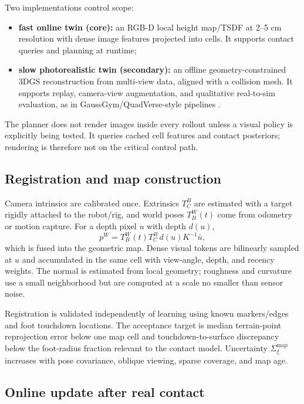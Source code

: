 Two implementations control scope:
\begin{itemize}
  \item \textbf{fast online twin (core):} an RGB-D local height map/TSDF at 2--5 cm resolution with dense image features projected into cells. It supports contact queries and planning at runtime;
  \item \textbf{slow photorealistic twin (secondary):} an offline geometry-constrained 3DGS reconstruction from multi-view data, aligned with a collision mesh. It supports replay, camera-view augmentation, and qualitative real-to-sim evaluation, as in GaussGym/QuadVerse-style pipelines \citep{escontrela2025gaussgym,chen2026quadverse}.
\end{itemize}
The planner does not render images inside every rollout unless a visual policy is explicitly being tested. It queries cached cell features and contact posteriors; rendering is therefore not on the critical control path.

\subsection{Registration and map construction}

Camera intrinsics are calibrated once. Extrinsics $T_C^B$ are estimated with a target rigidly attached to the robot/rig, and world poses $T_B^W(t)$ come from odometry or motion capture. For a depth pixel $u$ with depth $d(u)$,
\begin{equation}
p^W=T_B^W(t)T_C^B\,d(u)K^{-1}\bar u,
\label{eq:backproject}
\end{equation}
which is fused into the geometric map. Dense visual tokens are bilinearly sampled at $u$ and accumulated in the same cell with view-angle, depth, and recency weights. The normal is estimated from local geometry; roughness and curvature use a small neighborhood but are computed at a scale no smaller than sensor noise.

Registration is validated independently of learning using known markers/edges and foot touchdown locations. The acceptance target is median terrain-point reprojection error below one map cell and touchdown-to-surface discrepancy below the foot-radius fraction relevant to the contact model. Uncertainty $\Sigma_\xi^{\mathrm{map}}$ increases with pose covariance, oblique viewing, sparse coverage, and map age.

\subsection{Online update after real contact}

